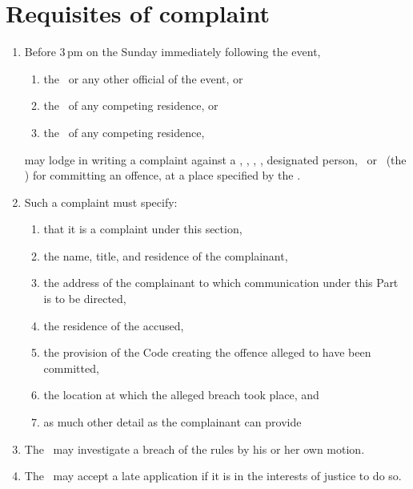 \documentclass[12pt]{report}
\begin{document}
  \section{Requisites of complaint}\label{sec:ReportsOfMisconduct}\label{sec:RequisitesComplaint}
  \begin{enumerate}
    \item Before  3\,pm on the Sunday immediately following the event,
    \begin{enumerate}
      \item the \RaceDirector\ or any other official of the event, or
      \item the \Captain\ of any competing residence, or
      \item the \President\ of any competing residence,
    \end{enumerate}
    may lodge in writing a complaint against a \competitor, \team, \squad, \spectator, designated person, \official\ or \residence\   (the ) for committing an offence, at a place specified by the \Referee.
    \item Such a complaint must specify:
    \begin{enumerate}
        \item that it is a complaint under this section,
      \item the name, title, and residence of the complainant,
      \item the address of the complainant to which communication under this Part is to be directed,
      \item the residence of the accused,
      \item the provision of the Code creating the offence alleged to have been committed,
      \item the location at which the alleged breach took place, and
      \item as much other detail as the complainant can provide
    \end{enumerate}
    \item The \Referee\ may investigate a breach of the rules by his or her own motion.
    \item The \Referee\ may accept a late application if it is in the interests of justice to do so.
  \end{enumerate}
\end{document}
